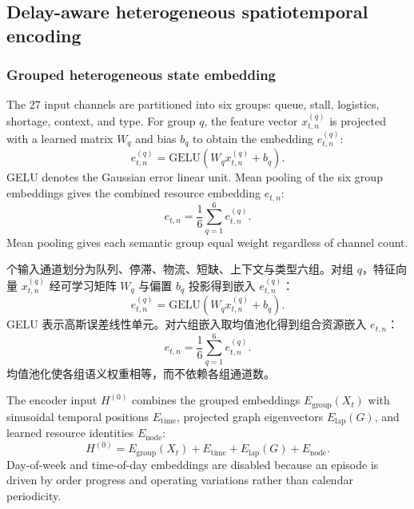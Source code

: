 \documentclass[a4paper,fleqn]{cas-dc}
\newcommand{\zhpara}[1]{%
  \par\begingroup\small\color{black!72}\noindent #1\par\endgroup}
\begin{document}
\subsection{Delay-aware heterogeneous spatiotemporal encoding}



\subsubsection{Grouped heterogeneous state embedding}

The 27 input channels are partitioned into six groups: queue, stall, logistics, shortage, context, and type. For group $q$, the feature vector $x^{(q)}_{t,n}$ is projected with a learned matrix $W_q$ and bias $b_q$ to obtain the embedding $e^{(q)}_{t,n}$:
\begin{equation}
e^{(q)}_{t,n}=\mathrm{GELU}
\left(W_q x^{(q)}_{t,n}+b_q\right).
\end{equation}
GELU denotes the Gaussian error linear unit. Mean pooling of the six group embeddings gives the combined resource embedding $e_{t,n}$:
\begin{equation}
e_{t,n}=\frac{1}{6}\sum_{q=1}^{6}e^{(q)}_{t,n}.
\end{equation}
Mean pooling gives each semantic group equal weight regardless of channel count.

\zhpara{27 个输入通道划分为队列、停滞、物流、短缺、上下文与类型六组。对组 $q$，特征向量 $x^{(q)}_{t,n}$ 经可学习矩阵 $W_q$ 与偏置 $b_q$ 投影得到嵌入 $e^{(q)}_{t,n}$：
\begin{equation}
e^{(q)}_{t,n}=\mathrm{GELU}
\left(W_q x^{(q)}_{t,n}+b_q\right).
\end{equation}
GELU 表示高斯误差线性单元。对六组嵌入取均值池化得到组合资源嵌入 $e_{t,n}$：
\begin{equation}
e_{t,n}=\frac{1}{6}\sum_{q=1}^{6}e^{(q)}_{t,n}.
\end{equation}
均值池化使各组语义权重相等，而不依赖各组通道数。}


The encoder input $H^{(0)}$ combines the grouped embeddings $E_{\mathrm{group}}(X_t)$ with sinusoidal temporal positions $E_{\mathrm{time}}$, projected graph eigenvectors $E_{\mathrm{lap}}(G)$, and learned resource identities $E_{\mathrm{node}}$:
\begin{equation}
H^{(0)}=E_{\mathrm{group}}(X_t)+
E_{\mathrm{time}}+E_{\mathrm{lap}}(G)+E_{\mathrm{node}}.
\end{equation}
Day-of-week and time-of-day embeddings are disabled because an episode is driven by order progress and operating variations rather than calendar periodicity.
\end{document}
